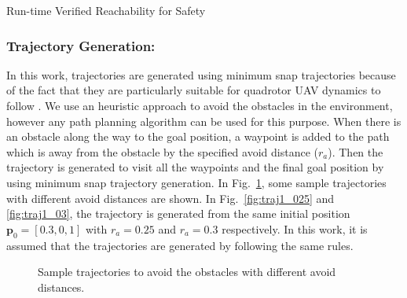 \begin{section}{Run-time Verified Reachability for Safety}
\subsubsection{Trajectory Generation:}
In this work, trajectories are generated using minimum snap trajectories because of the fact that they are particularly suitable for quadrotor UAV dynamics to follow \cite{Mellinger2011}. We use an heuristic approach to avoid the obstacles in the environment, however any path planning algorithm can be used for this purpose. When there is an obstacle along the way to the goal position, a waypoint is added to the path which is away from the obstacle by the specified avoid distance ($ r_a $). Then the trajectory is generated to visit all the waypoints and the final goal position by using minimum snap trajectory generation. In Fig.~\ref{fig:trajs}, some sample trajectories with different avoid distances are shown. In Fig.~\ref{fig:traj1_025} and \ref{fig:traj1_03}, the trajectory is generated from the same initial position $ \boldsymbol{p}_0 = [0.3, 0, 1] $ with $ r_a = 0.25 $ and $ r_a = 0.3 $ respectively. In this work, it is assumed that the trajectories are generated by following the same rules.
\begin{figure}[h]
	\centering
	\caption{Sample trajectories to avoid the obstacles with different avoid distances.}
	\label{fig:trajs}
\end{figure}


\end{section}
